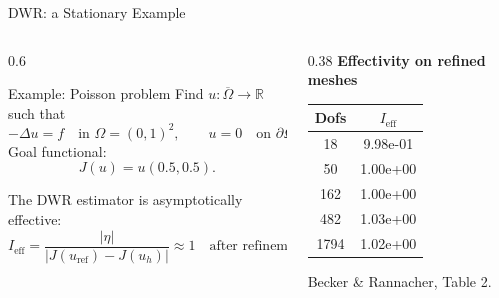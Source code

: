 \documentclass[aspectratio=169]{beamer}
\begin{document}
\begin{frame}[t]{DWR: a Stationary Example}
\begin{columns}[T,onlytextwidth]
\begin{column}{0.6\textwidth}
\begin{exampleblock}{Example: Poisson problem}
\small
Find $u:\overline{\Omega}\to\mathbb{R}$ such that
\[
-\Delta u = f \quad \text{in } \Omega=(0,1)^2,
\qquad
u=0 \quad \text{on } \partial\Omega.
\]
Goal functional:
\[
J(u)=u(0.5,0.5).
\]
\end{exampleblock}
\vspace{1em}
The DWR estimator is asymptotically effective:
\[
I_{\mathrm{eff}}
=\frac{|\eta|}{|J(u_{\mathrm{ref}})-J(u_h)|}
\approx 1
\quad \text{after refinement.}
\]
\end{column}

\pause
\begin{column}{0.38\textwidth}
\centering
\small
\vspace{3em}
\textbf{Effectivity on refined meshes}

\vspace{0.8em}

\renewcommand{\arraystretch}{1.15}
\begin{tabular}{c c}
\hline
Dofs & $I_{\mathrm{eff}}$ \\
\hline
18    & 9.98e-01 \\
50    & 1.00e+00 \\
162   & 1.00e+00 \\
482   & 1.03e+00 \\
1794 & 1.02e+00 \\
\hline
\end{tabular}

\vspace{0.8em}
{\scriptsize Becker \& Rannacher, Table 2.}
\end{column}
\end{columns}

\end{frame}


\end{document}
